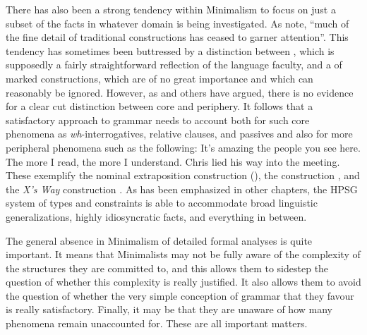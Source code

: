 \documentclass[output=paper,biblatex,babelshorthands,newtxmath,draftmode,colorlinks,citecolor=brown]{langscibook}
\begin{document}
\largerpage
There has also been a strong tendency within Minimalism to focus on just a subset of the facts in
whatever domain is being investigated. As \citet[535]{CJ2005a} note, ``much of the fine detail of
traditional constructions has ceased to garner attention''. This tendency has sometimes been
buttressed by a distinction between , which is supposedly a fairly straightforward
reflection of the language faculty, and a  of marked constructions, which are of no great
importance and which can reasonably be ignored. However, as \citet{Culicover99a-u} and others have
argued, there is no evidence for a clear cut distinction between core and periphery. It follows that
a satisfactory approach to grammar needs to account both for such core phenomena as
\emph{wh}-interrogatives, relative clauses, and passives and also for more peripheral phenomena
such as the following: 
\eal
\ex It's amazing the people you see here.\label{ex:min-amazing-people}
\ex The more I read, the more I understand.\label{ex:min-read-understand}
\ex Chris lied his way into the meeting.\label{ex:min-chris-meeting}
\zl 
These exemplify the nominal extraposition construction (\citealt{ML96a}), the  construction \citep{CJ99a-u,Borsley2011a-u}, and
the \emph{X's Way} construction \citep{Salkoff88a-u,Sag2012a}. As has been emphasized in other
chapters, the HPSG system of types and constraints is able to accommodate broad linguistic
generalizations, highly idiosyncratic facts, and everything in between. 

The general absence in Minimalism of detailed formal analyses is quite important. It means that
Minimalists may not be fully aware of the complexity of the structures they are committed to, and
this allows them to sidestep the question of whether this complexity is really justified. It also allows them to avoid
the question of whether the very simple conception of grammar that they favour is really
satisfactory. Finally, it may be that they are unaware of how many phenomena remain unaccounted
for. These are all important matters.  
\end{document}
